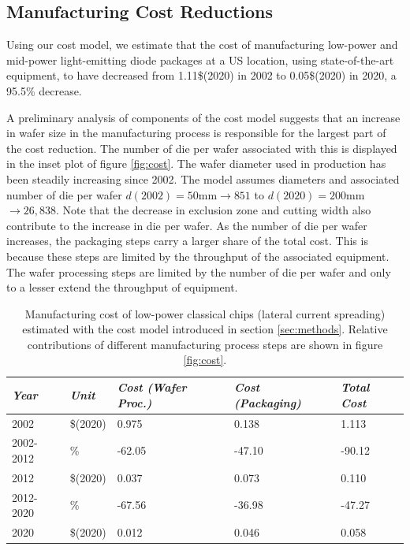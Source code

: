 \documentclass[a4paper,nocompress]{spie}  %
\begin{document}
\subsection{Manufacturing Cost Reductions}
    
    Using our cost model, we estimate that the cost of manufacturing low-power and mid-power light-emitting diode packages at a US location, using state-of-the-art equipment, to have decreased from 1.11\$(2020) in 2002 to 0.05\$(2020) in 2020, a 95.5\% decrease. 
    
    A preliminary analysis of components of the cost model suggests that an increase in wafer size in the manufacturing process is responsible for the largest part of the cost reduction. The number of die per wafer associated with this is displayed in the inset plot of figure \ref{fig:cost}. The wafer diameter used in production has been steadily increasing since 2002. The model assumes diameters and associated number of die per wafer  $d(2002)=50$mm$\rightarrow851$ to $d(2020)=200$mm$\rightarrow26,838$. Note that the decrease in exclusion zone and cutting width also contribute to the increase in die per wafer. As the number of die per wafer increases, the packaging steps carry a larger share of the total cost. This is because these steps are limited by the throughput of the associated equipment. The wafer processing steps are limited by the number of die per wafer and only to a lesser extend the throughput of equipment.
    
    \begin{table}[h!]
        \caption{Manufacturing cost of low-power classical chips (lateral current spreading) estimated with the cost model introduced in section \ref{sec:methods}. Relative contributions of different manufacturing process steps are shown in figure \ref{fig:cost}.}
        \bigskip
            \centering
            \begin{tabularx}{\textwidth}{|l|l|X|X|X|}
            	\hline
            		\textit{Year} & \textit{Unit} & \textit{Cost (Wafer Proc.)} & \textit{Cost (Packaging)} & \textit{Total Cost} \\
                \hline
                    2002 & \$(2020) & 0.975 & 0.138 & 1.113 \\
                \hline
                    2002-2012 & \% & -62.05 & -47.10 & -90.12 \\
                \hline
                    2012 & \$(2020) & 0.037 & 0.073 & 0.110 \\
                \hline
                    2012-2020 & \% & -67.56 & -36.98 & -47.27 \\
                \hline
                    2020 & \$(2020) & 0.012 & 0.046 & 0.058 \\
                \hline
            \end{tabularx}
            \label{tab:cost}
        \end{table}
\end{document}
